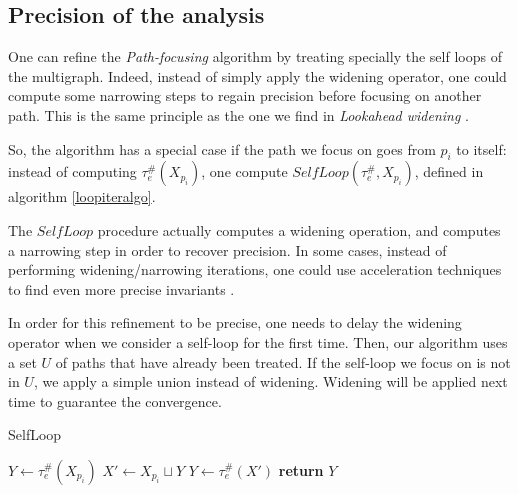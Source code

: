 \documentclass[a4paper,english,titlepage,11pt]{article}
\begin{document}
	\subsection {Precision of the analysis}

	One can refine the \emph{Path-focusing} algorithm by treating specially the
	self loops of the multigraph. Indeed, instead of simply apply the widening
	operator, one could compute some narrowing steps to regain precision before
	focusing on another path. This is the same principle as the one we find in
	\emph{Lookahead widening} \cite{GopanR06}.

	So, the algorithm has a special case if the path we focus on goes from $p_i$
	to itself: instead of computing $\tau_e^\#(X_{p_i})$, one compute
	$SelfLoop(\tau_e^\#,X_{p_i})$, defined in algorithm \ref{loopiteralgo}.

	The $SelfLoop$ procedure actually computes a widening operation, and
	computes a narrowing step in order to recover precision. In some cases,
	instead of performing widening/narrowing iterations, one could use
	acceleration techniques to find even more precise invariants \cite{GH06}.

	In order for this refinement to be precise, one needs to delay the widening
	operator when we consider a self-loop for the first time. Then, our
	algorithm uses a set $U$ of paths that have already been treated. If the
	self-loop we focus on is not in $U$, we apply a simple union instead of
	widening. Widening will be applied next time to guarantee the convergence.
	
\begin{algorithm}
\caption{SelfLoop}
\label{loopiteralgo}
\begin{algorithmic}[1] 
	\State $Y \gets \tau_e^\#(X_{p_i})$
	\State $X' \gets X_{p_i} \sqcup Y$
	\State $Y \gets \tau_e^\#(X')$
	\State \textbf{return} $Y$
\EndProcedure
\end{algorithmic}
\end{algorithm}
\end{document}
